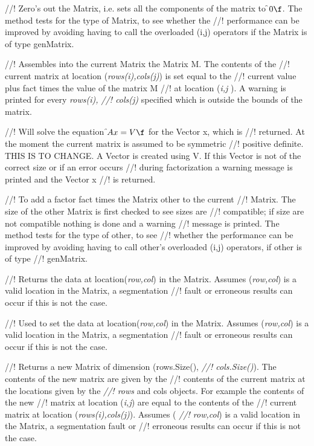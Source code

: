//! Zero's out the Matrix, i.e. sets all the components of the matrix to
\f$0\f$. The method tests for the type of Matrix, to see whether the
//! performance can be improved by avoiding having to call the overloaded
(i,j) operators if the Matrix is of type genMatrix. 

//! Assembles into the current Matrix the Matrix \p M. The contents of the
//! current matrix at location ({\em rows(i),cols(j)}) is set equal to the
//! current value plus \p fact times the value of the matrix \p M
//! at location ({\em i,j }). A warning is printed for every {\em rows(i),
//! cols(j)} specified which is outside the bounds of the matrix.

//! Will solve the equation {\em \f$Ax=V\f$} for the Vector \p x, which is
//! returned. At the moment the current matrix is assumed to be symmetric
//! positive definite. THIS IS TO CHANGE. A Vector is created using
\p V. If this Vector is not of the correct size or if an error occurs
//! during factorization a warning message is printed and the Vector \p x
//! is returned. 

//! To add a factor \p fact times the Matrix \p other to the current
//! Matrix. The size of the other Matrix is first checked to see sizes are 
//! compatible; if size are not compatible nothing is done and a warning
//! message is printed. The method tests for the type of \p other, to see
//! whether the performance can be improved by avoiding having to call
\p other's overloaded (i,j) operators, if \p other is of type
//! genMatrix. 


//! Returns the data at location({\em row,col}) in the Matrix. Assumes
({\em row,col}) is a valid location in the Matrix, a segmentation
//! fault or erroneous results can occur if this is not the case.

//! Used to set the data at location({\em row,col}) in the Matrix. Assumes
({\em row,col}) is a valid location in the Matrix, a segmentation
//! fault or erroneous results can occur if this is not the case.

//! Returns a new Matrix of dimension (rows.Size(), {\em
//! cols.Size()}). The contents of the new matrix are given by the
//! contents of the current matrix at the locations given by the {\em
//! rows} and \p cols objects. For example the contents of the new
//! matrix at location ({\em i,j}) are equal to the contents of the
//! current matrix at location ({\em rows(i),cols(j)}). Assumes ({\em
//! row,col}) is a valid location in the Matrix, a segmentation fault or
//! erroneous results can occur if this is not the case.

